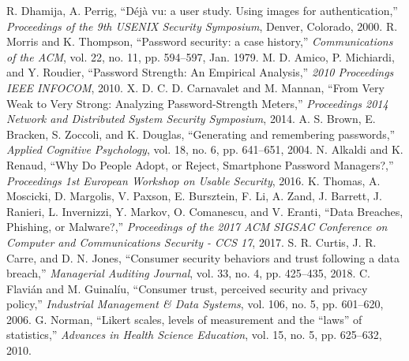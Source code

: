 \documentclass[letterpaper, 10 pt, conference]{ieeeconf}  %
\begin{document}
\begin{thebibliography}{99}

 R. Dhamija, A. Perrig, ``Déjà vu: a user study. Using images for authentication,'' \textit{Proceedings of the 9th USENIX Security Symposium}, Denver, Colorado, 2000.
 R. Morris and K. Thompson, ``Password security: a case history,'' \textit{Communications of the ACM}, vol. 22, no. 11, pp. 594–597, Jan. 1979.
 M. D. Amico, P. Michiardi, and Y. Roudier, ``Password Strength: An Empirical Analysis,'' \textit{2010 Proceedings IEEE INFOCOM}, 2010.
 X. D. C. D. Carnavalet and M. Mannan, ``From Very Weak to Very Strong: Analyzing Password-Strength Meters,'' \textit{Proceedings 2014 Network and Distributed System Security Symposium}, 2014.
 A. S. Brown, E. Bracken, S. Zoccoli, and K. Douglas, ``Generating and remembering passwords,'' \textit{Applied Cognitive Psychology}, vol. 18, no. 6, pp. 641–651, 2004.
 N. Alkaldi and K. Renaud, ``Why Do People Adopt, or Reject, Smartphone Password Managers?,'' \textit{Proceedings 1st European Workshop on Usable Security}, 2016.
 K. Thomas, A. Moscicki, D. Margolis, V. Paxson, E. Bursztein, F. Li, A. Zand, J. Barrett, J. Ranieri, L. Invernizzi, Y. Markov, O. Comanescu, and V. Eranti, ``Data Breaches, Phishing, or Malware?,'' \textit{Proceedings of the 2017 ACM SIGSAC Conference on Computer and Communications Security - CCS 17}, 2017.
 S. R. Curtis, J. R. Carre, and D. N. Jones, ``Consumer security behaviors and trust following a data breach,'' \textit{Managerial Auditing Journal}, vol. 33, no. 4, pp. 425–435, 2018.
 C. Flavián and M. Guinalíu, ``Consumer trust, perceived security and privacy policy,'' \textit{Industrial Management \& Data Systems}, vol. 106, no. 5, pp. 601–620, 2006.
 G. Norman, ``Likert scales, levels of measurement and the “laws” of statistics,'' \textit{Advances in Health Science Education}, vol. 15, no. 5, pp. 625–632, 2010.


\end{thebibliography}
\end{document}
